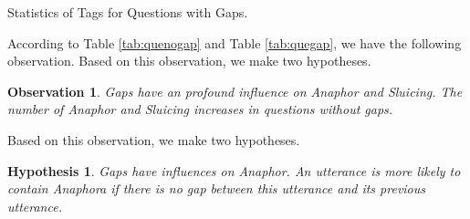 \documentclass[bsc,frontabs,twoside,singlespacing,parskip,deptreport]{infthesis}     %
\newtheorem{observation}{Observation}[chapter]
\newtheorem{hypo}{Hypothesis}[chapter]
\begin{document}
\begin{minipage}{\textwidth}
\begin{minipage}[t]{0.45\textwidth}
\caption{Statistics of Tags for Questions with Gaps.}
\label{tab:quegap}


        \end{minipage}
    \end{minipage}


According to Table \ref{tab:quenogap} and Table \ref{tab:quegap}, we have the following observation. Based on this observation, we make two hypotheses. 

\begin{observation}
Gaps have an profound influence on Anaphor and Sluicing. The number of Anaphor and Sluicing increases in questions without gaps.
\end{observation}

Based on this observation, we make two hypotheses.

\begin{hypo}
Gaps have influences on Anaphor. An utterance is more likely to contain Anaphora if there is no gap between this utterance and its previous utterance.
\end{hypo}
\end{document}
